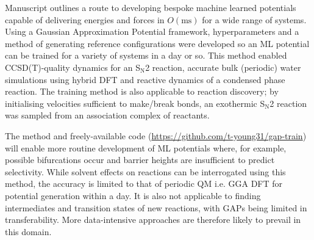 \documentclass[../../main.tex]{subfiles}
\begin{document}
Manuscript  outlines a route to developing bespoke machine learned potentials capable of delivering energies and forces in $O(\text{ms})$ for a wide range of systems. Using a Gaussian Approximation Potential framework,\cite{Bartok2010} hyperparameters and a method of generating reference configurations were developed so an ML potential can be trained for a variety of systems in a day or so. This method enabled CCSD(T)-quality dynamics for an S${}_\text{N}$2 reaction, accurate bulk (periodic) water simulations using hybrid DFT and reactive dynamics of a condensed phase reaction. The training method is also applicable to reaction discovery; by initialising velocities sufficient to make/break bonds, an exothermic S${}_\text{N}$2 reaction was sampled from an association complex of reactants.

The method and freely-available code ({\url{https://github.com/t-young31/gap-train}}) will enable more routine development of ML potentials where, for example, possible bifurcations occur and barrier heights are insufficient to predict selectivity.\cite{Feng2021} While solvent effects on reactions can be interrogated using this method, the accuracy is limited to that of periodic QM i.e. GGA DFT for potential generation within a day. It is also not applicable to finding intermediates and transition states of new reactions, with GAPs being limited in transferability. More data-intensive approaches are therefore likely to prevail in this domain.\cite{Smith2017, Devereux2020} 


\clearpage
\end{document}
